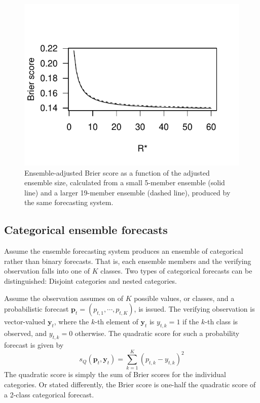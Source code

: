 \documentclass[article]{jss}\usepackage{graphicx, color}
\makeatletter
\def\maxwidth{ %
  \ifdim\Gin@nat@width>\linewidth
    \linewidth
  \else
    \Gin@nat@width
  \fi
}
\newenvironment{knitrout}{}{} %
\makeatother
\begin{document}
\begin{figure}
\begin{center}
\begin{knitrout}
\color{fgcolor}
\includegraphics[width=\maxwidth]{figure/ens-brier} 

\end{knitrout}

\caption{Ensemble-adjusted Brier score as a function of the adjusted ensemble size, calculated from a small 5-member ensemble (solid line) and a larger 19-member ensemble (dashed line), produced by the same forecasting system.}
\label{fig:ens-brier}
\end{center}
\end{figure}


\subsection{Categorical ensemble forecasts}


Assume the ensemble forecasting system produces an ensemble of categorical rather than binary forecasts.
That is, each ensemble members and the verifying observation falls into one of $K$ classes.
Two types of categorical forecasts can be distinguished: Disjoint categories and nested categories.

Assume the observation assumes on of $K$ possible values, or classes, and a probabilistic forecast $\mathbf{p}_t = (p_{t,1}, \cdots, p_{t,K})$, is issued.
The verifying observation is vector-valued $\mathbf{y}_t$, where the $k$-th element of $\mathbf{y}_t$ is $y_{t,k}=1$ if the $k$-th class is observed, and $y_{t,k}=0$ otherwise.
The quadratic score for such a probability forecast is given by
%
\begin{equation}
s_{Q}(\mathbf{p}_t, \mathbf{y}_t) = \sum_{k=1}^K \left(p_{t,k} - y_{t,k}\right)^2
\end{equation}
%
The quadratic score is simply the sum of Brier scores for the individual categories.
Or stated differently, the Brier score is one-half the quadratic score of a 2-class categorical forecast.
\end{document}

